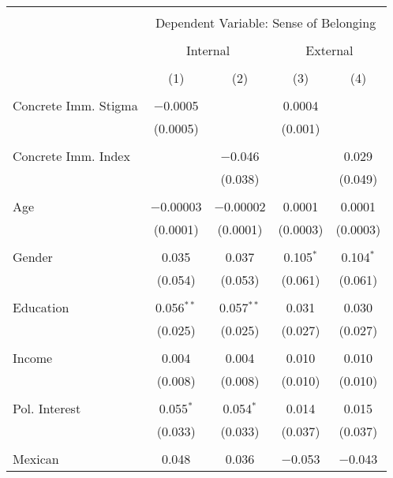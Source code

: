 
\begin{table}[!htbp] \centering 
  \caption{} 
  \label{} 
\begin{tabular}{@{\extracolsep{5pt}}lcccc} 
\\[-1.8ex]\hline 
\hline \\[-1.8ex] 
 & \multicolumn{4}{c}{Dependent Variable: Sense of Belonging} \\ 
\cline{2-5} 
\\[-1.8ex] & \multicolumn{2}{c}{Internal} & \multicolumn{2}{c}{External} \\ 
\\[-1.8ex] & (1) & (2) & (3) & (4)\\ 
\hline \\[-1.8ex] 
 Concrete Imm. Stigma & $-$0.0005 &  & 0.0004 &  \\ 
  & (0.0005) &  & (0.001) &  \\ 
  & & & & \\ 
 Concrete Imm. Index &  & $-$0.046 &  & 0.029 \\ 
  &  & (0.038) &  & (0.049) \\ 
  & & & & \\ 
 Age & $-$0.00003 & $-$0.00002 & 0.0001 & 0.0001 \\ 
  & (0.0001) & (0.0001) & (0.0003) & (0.0003) \\ 
  & & & & \\ 
 Gender & 0.035 & 0.037 & 0.105$^{*}$ & 0.104$^{*}$ \\ 
  & (0.054) & (0.053) & (0.061) & (0.061) \\ 
  & & & & \\ 
 Education & 0.056$^{**}$ & 0.057$^{**}$ & 0.031 & 0.030 \\ 
  & (0.025) & (0.025) & (0.027) & (0.027) \\ 
  & & & & \\ 
 Income & 0.004 & 0.004 & 0.010 & 0.010 \\ 
  & (0.008) & (0.008) & (0.010) & (0.010) \\ 
  & & & & \\ 
 Pol. Interest & 0.055$^{*}$ & 0.054$^{*}$ & 0.014 & 0.015 \\ 
  & (0.033) & (0.033) & (0.037) & (0.037) \\ 
  & & & & \\ 
 Mexican & 0.048 & 0.036 & $-$0.053 & $-$0.043 \\ 

\end{tabular}
\end{table}
